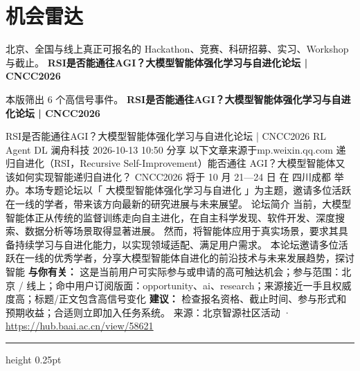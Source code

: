 \documentclass[10.5pt]{ctexart}
\begin{document}
\section*{机会雷达}
{\color{ormuted} 北京、全国与线上真正可报名的 Hackathon、竞赛、科研招募、实习、Workshop 与截止。}
\vspace{2mm}
{\LARGE\bfseries RSI是否能通往AGI？大模型智能体强化学习与自进化论坛 | CNCC2026}\par
\vspace{1mm}
{\color{ormuted} 本版筛出 6 个高信号事件。}
\vspace{3mm}
{\Large\bfseries RSI是否能通往AGI？大模型智能体强化学习与自进化论坛 | CNCC2026}\par
RSI是否能通往AGI？大模型智能体强化学习与自进化论坛 | CNCC2026 RL Agent DL 澜舟科技 2026-10-13 10:50 分享 以下文章来源于mp.weixin.qq.com 递归自进化（RSI，Recursive Self-Improvement）能否通往 AGI？大模型智能体又该如何实现智能递归自进化？ CNCC2026 将于 10 月 21—24 日 在 四川成都 举办。本场专题论坛以「 大模型智能体强化学习与自进化 」为主题，邀请多位活跃在一线的学者，带来该方向最新的研究进展与未来展望。 论坛简介 当前，大模型智能体正从传统的监督训练走向自主进化，在自主科学发现、软件开发、深度搜索、数据分析等场景取得显著进展。 然而，将智能体应用于真实场景，要求其具备持续学习与自进化能力，以实现领域适配、满足用户需求。 本论坛邀请多位活跃在一线的优秀学者，分享大模型智能体自进化的前沿技术与未来发展趋势，探讨智能
\textbf{与你有关：} 这是当前用户可实际参与或申请的高可触达机会；参与范围：北京 / 线上；命中用户订阅版面：opportunity、ai、research；来源接近一手且权威度高；标题/正文包含高信号变化
\textbf{建议：} 检查报名资格、截止时间、参与形式和预期收益；合适则立即加入任务系统。
{\footnotesize\color{ormuted} 来源：北京智源社区活动 · \url{https://hub.baai.ac.cn/view/58621}}
\vspace{4mm}
\hrule height 0.25pt
\vspace{3mm}
\end{document}
